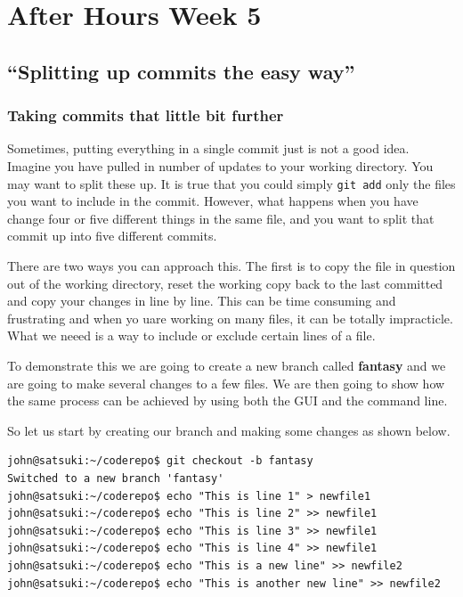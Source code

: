 \chapter{After Hours Week 5}
\section{``Splitting up commits the easy way''}
\subsection{Taking commits that little bit further}

Sometimes, putting everything in a single commit just is not a good idea.  Imagine you have pulled in number of updates to your working directory.  You may want to split these up.  It is true that you could simply \texttt{git add} only the files you want to include in the commit.  However, what happens when you have change four or five different things in the same file, and you want to split that commit up into five different commits.

There are two ways you can approach this.  The first is to copy the file in question out of the working directory, reset the working copy back to the last committed and copy your changes in line by line.  This can be time consuming and frustrating and when yo uare working on many files, it can be totally impracticle.  What we neeed is a way to include or exclude certain lines of a file.

To demonstrate this we are going to create a new branch called \textbf{fantasy} and we are going to make several changes to a few files.  We are then going to show how the same process can be achieved by using both the GUI and the command line.

So let us start by creating our branch and making some changes as shown below.

\begin{Verbatim}[frame=leftline,framerule=1mm,fontsize=\relsize{-3}] 
john@satsuki:~/coderepo$ git checkout -b fantasy
Switched to a new branch 'fantasy'
john@satsuki:~/coderepo$ echo "This is line 1" > newfile1 
john@satsuki:~/coderepo$ echo "This is line 2" >> newfile1
john@satsuki:~/coderepo$ echo "This is line 3" >> newfile1
john@satsuki:~/coderepo$ echo "This is line 4" >> newfile1
john@satsuki:~/coderepo$ echo "This is a new line" >> newfile2 
john@satsuki:~/coderepo$ echo "This is another new line" >> newfile2 
\end{Verbatim}

